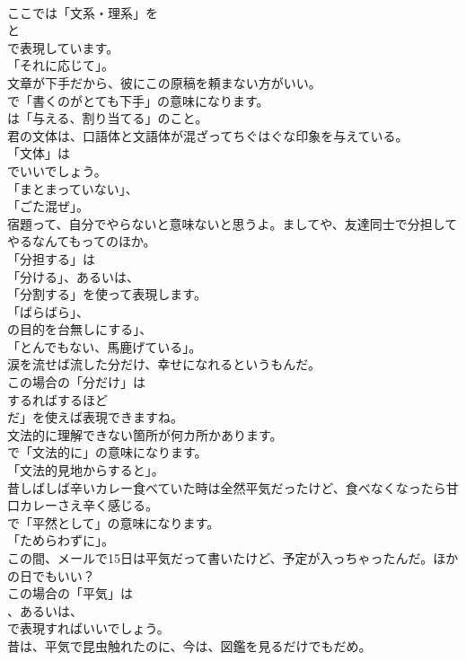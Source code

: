 \documentclass[8pt]{extreport}
\begin{document}
\begin{CJK}{UTF8}{min}
\\	ここでは「文系・理系」を
\\	と
\\	で表現しています。
\\	「それに応じて」。	
\\	文章が下手だから、彼にこの原稿を頼まない方がいい。 
\\	で「書くのがとても下手」の意味になります。
\\	は「与える、割り当てる」のこと。	
\\	君の文体は、口語体と文語体が混ざってちぐはぐな印象を与えている。 
\\	「文体」は
\\	でいいでしょう。
\\	「まとまっていない」、
\\	「ごた混ぜ」。	
\\	宿題って、自分でやらないと意味ないと思うよ。ましてや、友達同士で分担してやるなんてもってのほか。 
\\	「分担する」は
\\	「分ける」、あるいは、
\\	「分割する」を使って表現します。
\\	「ばらばら」、
\\	の目的を台無しにする」、
\\	「とんでもない、馬鹿げている」。	
\\	涙を流せば流した分だけ、幸せになれるというもんだ。 
\\	この場合の「分だけ」は
\\	するればするほど 
\\	だ」を使えば表現できますね。	
\\	文法的に理解できない箇所が何カ所かあります。 
\\	で「文法的に」の意味になります。
\\	「文法的見地からすると」。	
\\	昔しばしば辛いカレー食べていた時は全然平気だったけど、食べなくなったら甘口カレーさえ辛く感じる。 
\\	で「平然として」の意味になります。
\\	「ためらわずに」。	
\\	この間、メールで15日は平気だって書いたけど、予定が入っちゃったんだ。ほかの日でもいい？ 
\\	この場合の「平気」は
\\	、あるいは、
\\	で表現すればいいでしょう。	
\\	昔は、平気で昆虫触れたのに、今は、図鑑を見るだけでもだめ。 

\end{CJK}
\end{document}
